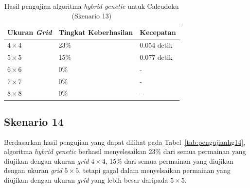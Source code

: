 \begin{table}
\centering
\captionsetup{justification=centering}
\caption[Hasil pengujian algoritma \textit{hybrid genetic} untuk Calcudoku (Skenario 13)]{Hasil pengujian algoritma \textit{hybrid genetic} untuk Calcudoku (Skenario 13)}
\begin{tabular}{| l | l | l |}
\hline
Ukuran \textit{Grid} & Tingkat Keberhasilan & Kecepatan \\
\hline \hline
\begin{math}4 \times 4\end{math} & 23\% & 0.054 detik \\
\hline
\begin{math}5 \times 5\end{math} & 15\% & 0.077 detik \\
\hline
\begin{math}6 \times 6\end{math} & 0\% & - \\
\hline
\begin{math}7 \times 7\end{math} & 0\% & - \\
\hline
\begin{math}8 \times 8\end{math} & 0\% & - \\
\hline
\end{tabular}
\label{tab:pengujianhg13}
\end{table}

\subsection{Skenario 14}
\label{sec:skenario14}

Berdasarkan hasil pengujian yang dapat dilihat pada Tabel~\ref{tab:pengujianhg14}, algoritma \textit{hybrid genetic} berhasil menyelesaikan 23\% dari semua permainan yang diujikan dengan ukuran \textit{grid} \begin{math}4 \times 4\end{math}, 15\% dari semua permainan yang diujikan dengan ukuran \textit{grid} \begin{math}5 \times 5\end{math}, tetapi gagal dalam menyelsaikan permainan yang diujikan dengan ukuran \textit{grid} yang lebih besar daripada \begin{math}5 \times 5\end{math}.

